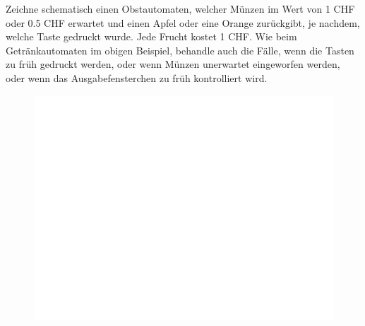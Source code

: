 %
%
Zeichne schematisch einen Obstautomaten, welcher Münzen im Wert von 1 CHF oder 0.5 CHF erwartet und einen Apfel oder eine Orange zurückgibt, je nachdem, welche Taste gedruckt wurde. Jede Frucht kostet 1 CHF. Wie beim Getränkautomaten im obigen Beispiel, behandle auch die Fälle, wenn die Tasten zu früh gedruckt werden, oder wenn Münzen unerwartet eingeworfen werden, oder wenn das Ausgabefensterchen zu früh kontrolliert wird.
\begin{figure}[H]
\centering
\includegraphics[width=0.5\linewidth]{Pictures/weiss.png}
\end{figure}
